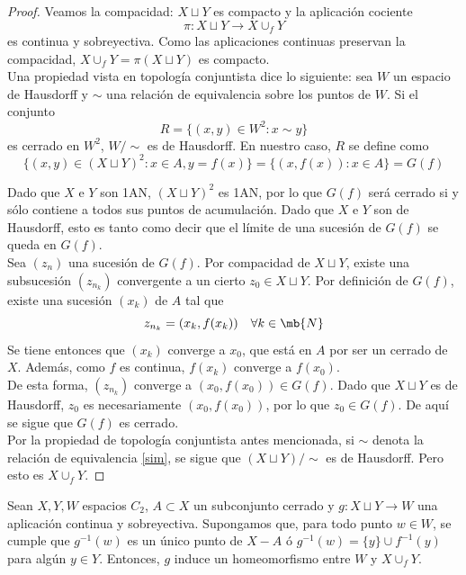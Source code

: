 \begin{proof}
Veamos la compacidad: $X\sqcup Y$ es compacto y la aplicación cociente $$\pi: X\sqcup Y \longrightarrow X \cup_f Y$$ es continua y sobreyectiva. Como las aplicaciones continuas preservan la compacidad, $X\cup_fY=\pi(X\sqcup Y)$ es compacto.
\\

Una propiedad vista en topología conjuntista dice lo siguiente: sea $W$ un espacio de Hausdorff y $\sim$ una relación de equivalencia sobre los puntos de $W$. Si el conjunto $$R=\{(x,y) \in W^2: x\sim y\}$$ es cerrado en $W^2$, $W/\sim$ es de Hausdorff. En nuestro caso, $R$ se define como $$\{(x,y) \in (X\sqcup Y)^2: x \in A, y=f(x)\}=\{(x,f(x)): x \in A\}=G(f)$$

Dado que $X$ e $Y$ son 1AN, $(X\sqcup Y)^2$ es 1AN, por lo que $G(f)$ será cerrado si y sólo contiene a todos sus puntos de acumulación. Dado que $X$ e $Y$ son de Hausdorff, esto es tanto como decir que el límite de una sucesión de $G(f)$ se queda en $G(f)$.
\\

Sea $(z_n)$ una sucesión de $G(f)$. Por compacidad de $X \sqcup Y$, existe una subsucesión $(z_{n_k})$ convergente a un cierto $z_0 \in X\sqcup Y$. Por definición de $G(f)$, existe una sucesión $(x_k)$ de $A$ tal que $$z_{n_k}=(x_k,f(x_k)) \quad \forall k \in \mb{N}$$ Se tiene entonces que $(x_k)$ converge a $x_0$, que está en $A$ por ser un cerrado de $X$. Además, como $f$ es continua, $f(x_k)$ converge a $f(x_0)$.
\\

De esta forma, $(z_{n_k})$ converge a $(x_0,f(x_0)) \in G(f)$. Dado que $X\sqcup Y$ es de Hausdorff, $z_0$ es necesariamente $(x_0,f(x_0))$, por lo que $z_0 \in G(f)$. De aquí se sigue que $G(f)$ es cerrado.
\\

Por la propiedad de topología conjuntista antes mencionada, si $\sim$ denota la relación de equivalencia \ref{sim}, se sigue que $(X\sqcup Y)/\sim$ es de Hausdorff. Pero esto es $X\cup_f Y$.
\end{proof}

\begin{lema}\label{RepAdj} Sean $X,Y,W$ espacios $C_2$, $A \subset X$ un subconjunto cerrado  y $g: X\sqcup Y \longrightarrow W$ una aplicación continua y sobreyectiva. Supongamos que, para todo punto $w \in W$, se cumple que $g^{-1}(w)$ es un único punto de $X-A$ ó $g^{-1}(w)=\{y\}\cup f^{-1}(y)$ para algún $y \in Y$. Entonces, $g$ induce un homeomorfismo entre $W$ y $X \cup_f Y$.\end{lema}

